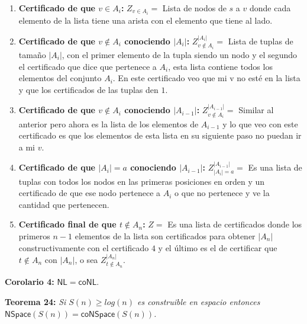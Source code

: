 \documentclass{article}
\begin{document}
\begin{enumerate}
  \item \textbf{Certificado de que \textcolor{Mulberry}{$v \in A_i$}:} $Z_{v \in A_i} =$ Lista de nodos de $s$ a $v$ donde cada elemento de la 
  lista tiene una arista con el elemento que tiene al lado.
  
  \item \textbf{Certificado de que \textcolor{Mulberry}{$v \not\in A_i$} conociendo \textcolor{Mulberry}{$|A_i|$}:}
  $Z_{v \not\in A_i}^{|A_i|} =$ Lista de tuplas de tamaño $|A_i|$, con el primer elemento de la tupla siendo un nodo y 
  el segundo el certificado que dice que pertenece a $A_i$, esta lista contiene todos los elementos del conjunto $A_i$.
  En este certificado veo que mi v no esté en la lista y que los certificados de las tuplas den $1$.

  \item \textbf{Certificado de que \textcolor{Mulberry}{$v \not\in A_i$} conociendo \textcolor{Mulberry}{$|A_{i-1}|$}:}
  $Z_{v \not\in A_i}^{|A_{i-1}|} =$ Similar al anterior pero ahora es la lista de los elementos de $A_{i-1}$ y lo que 
  veo con este certificado es que los elementos de esta lista en su siguiente paso no puedan ir a mi $v$.

  \item \textbf{Certificado de que \textcolor{Mulberry}{$|A_i| = a$} conociendo \textcolor{Mulberry}{$|A_{i-1}|$}:}
  $Z_{|A_i| = a}^{|A_{i-1}|} =$ Es una lista de tuplas con todos los nodos en las primeras posiciones en orden y un 
  certificado de que ese nodo pertenece a $A_i$ o que no pertenece y ve la cantidad que pertenecen.

  \item \textbf{Certificado final de que \textcolor{Mulberry}{$t \not\in A_n$}:} $Z =$ Es una lista de certificados 
  donde los primeros $n-1$ elementos de la lista son certificados para obtener $|A_n|$ constructivamente con el certificado
  $4$ y el último es el de certificar que $t \not\in A_n$ con $|A_n|$, o sea $Z_{t \not\in A_n}^{|A_n|}$.
\end{enumerate}

\begin{flushleft}
  \textbf{Corolario 4:}
  $\mathsf{NL} = \mathsf{coNL}$.
\end{flushleft}

\begin{flushleft}
  \textbf{Teorema 24:}
  \textit{Si $S(n) \geq log(n)$ es construible en espacio entonces $\mathsf{NSpace}(S(n)) = \mathsf{coNSpace}
  (S(n))$.}
\end{flushleft}
\end{document}
